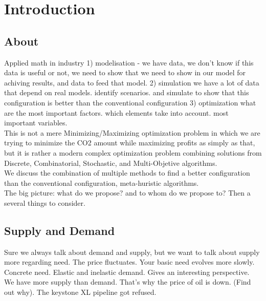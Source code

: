 \documentclass[12pt]{article}
\begin{document}
\maketitle
\tableofcontents
\newpage

\section{Introduction}

\subsection{About}
Applied math in industry
1) modelisation
  - we have data, we don't know if this data is useful or not, we need to show that we
need to show in our model for achiving results, and data to feed that model. 
2) simulation
we have a lot of data that depend on real models. identify scenarios. and simulate to 
show that this configuration is better than the conventional configuration 
3) optimization 
what are the most important factors. which elements take into account. most important
variables. \\

This is not a mere Minimizing/Maximizing optimization problem in which we are trying to minimize the CO2 amount while maximizing profits as simply as that, but it is rather
a modern complex optimization problem combining solutions from Discrete, Combinatorial,
Stochastic, and Multi-Objetive algorithms. \\

We discuss the combination of multiple methods to find a better configuration than
the conventional configuration, meta-huristic algorithms. \\

The big picture: what do we propose? and to whom do we propose to? Then a several things to consider. 

\subsection{Supply and Demand}
Sure we always talk about demand and supply, but we want to talk about supply more regarding need. The price fluctuates. Your basic need evolves more slowly. Concrete need. Elastic and inelastic demand. Gives an interesting perspective. \\

We have more supply than demand. That's why the price of oil is down. (Find out why). The keystone XL pipeline got refused.\\
\end{document}
